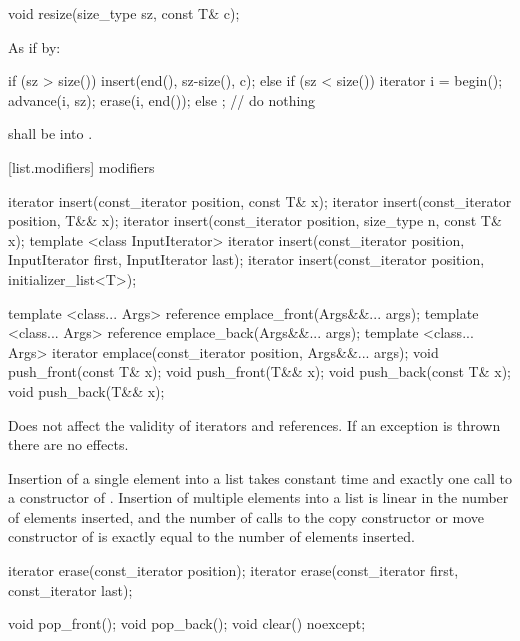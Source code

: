%
\begin{itemdecl}
void resize(size_type sz, const T& c);
\end{itemdecl}

\begin{itemdescr}
\pnum
\effects
As if by:
\begin{codeblock}
if (sz > size())
  insert(end(), sz-size(), c);
else if (sz < size()) {
  iterator i = begin();
  advance(i, sz);
  erase(i, end());
}
else
  ;                 // do nothing
\end{codeblock}

\pnum
\requires {} shall be  into .
\end{itemdescr}

[list.modifiers]{ modifiers}

%
\begin{itemdecl}
iterator insert(const_iterator position, const T& x);
iterator insert(const_iterator position, T&& x);
iterator insert(const_iterator position, size_type n, const T& x);
template <class InputIterator>
  iterator insert(const_iterator position, InputIterator first,
                  InputIterator last);
iterator insert(const_iterator position, initializer_list<T>);

template <class... Args> reference emplace_front(Args&&... args);
template <class... Args> reference emplace_back(Args&&... args);
template <class... Args> iterator emplace(const_iterator position, Args&&... args);
void push_front(const T& x);
void push_front(T&& x);
void push_back(const T& x);
void push_back(T&& x);
\end{itemdecl}

\begin{itemdescr}
\pnum
\remarks
Does not affect the validity of iterators and references.
If an exception is thrown there are no effects.

\pnum
\complexity
Insertion of a single element into a list takes constant time and
exactly one call to a constructor of
. Insertion of multiple elements into a list is linear in the
number of elements inserted, and the number of calls to the copy
constructor or move constructor of  is exactly equal
to the number of elements inserted.
\end{itemdescr}

%
\begin{itemdecl}
iterator erase(const_iterator position);
iterator erase(const_iterator first, const_iterator last);

void pop_front();
void pop_back();
void clear() noexcept;
\end{itemdecl}

